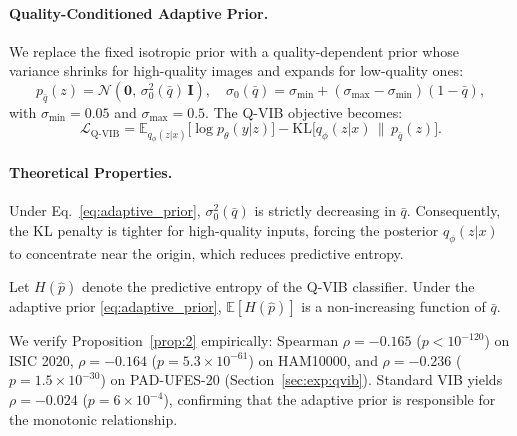 \paragraph{Quality-Conditioned Adaptive Prior.}
We replace the fixed isotropic prior with a quality-dependent prior whose variance shrinks for high-quality images and expands for low-quality ones:
\begin{equation}
  p_{\bar{q}}(z) = \mathcal{N}\!\left(\mathbf{0},\, \sigma_0^2(\bar{q})\,\mathbf{I}\right), \quad
  \sigma_0(\bar{q}) = \sigma_{\min} + (\sigma_{\max} - \sigma_{\min})(1 - \bar{q}),
  \label{eq:adaptive_prior}
\end{equation}
with $\sigma_{\min} = 0.05$ and $\sigma_{\max} = 0.5$.
The Q-VIB objective becomes:
\begin{equation}
  \mathcal{L}_{\text{Q-VIB}} = \mathbb{E}_{q_\phi(z|x)}\bigl[\log p_\theta(y|z)\bigr]
    - \mathrm{KL}\bigl[q_\phi(z|x) \,\|\, p_{\bar{q}}(z)\bigr].
  \label{eq:qvib}
\end{equation}

\paragraph{Theoretical Properties.}

\begin{lemma}
\label{lem:1}
Under Eq.~\eqref{eq:adaptive_prior}, $\sigma_0^2(\bar{q})$ is strictly decreasing in $\bar{q}$.
Consequently, the KL penalty is tighter for high-quality inputs, forcing the posterior $q_\phi(z|x)$ to concentrate near the origin, which reduces predictive entropy.
\end{lemma}

\begin{proposition}
\label{prop:2}
Let $H(\hat{p})$ denote the predictive entropy of the Q-VIB classifier.
Under the adaptive prior \eqref{eq:adaptive_prior}, $\mathbb{E}[H(\hat{p})]$ is a non-increasing function of $\bar{q}$.
\end{proposition}

We verify Proposition~\ref{prop:2} empirically: Spearman $\rho = -0.165$ ($p < 10^{-120}$) on ISIC 2020, $\rho = -0.164$ ($p = 5.3 \times 10^{-61}$) on HAM10000, and $\rho = -0.236$ ($p = 1.5 \times 10^{-30}$) on PAD-UFES-20 (Section~\ref{sec:exp:qvib}).
Standard VIB yields $\rho = -0.024$ ($p = 6 \times 10^{-4}$), confirming that the adaptive prior is responsible for the monotonic relationship.

